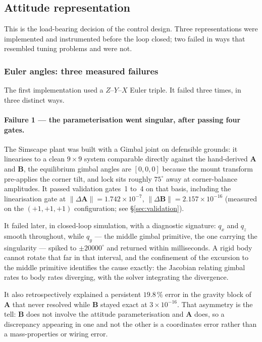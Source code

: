 \subsection{Attitude representation}
\label{sec:attitude-representation}

This is the load-bearing decision of the control design. Three
representations were implemented and instrumented before the loop closed; two
failed in ways that resembled tuning problems and were not.

\subsubsection{Euler angles: three measured failures}
\label{sec:euler-failures}

The first implementation used a $Z$--$Y$--$X$ Euler triple. It failed three
times, in three distinct ways.

\paragraph{Failure 1 --- the parameterisation went singular, after passing
four gates.} The Simscape plant was built with a Gimbal joint on defensible
grounds: it linearises to a clean $9\times9$ system comparable directly
against the hand-derived $\bm{A}$ and $\bm{B}$, the equilibrium gimbal angles
are $[0,0,0]$ because the mount transform pre-applies the corner tilt, and
lock sits roughly $75^\circ$ away at corner-balance amplitudes. It passed
validation gates~1 to~4 on that basis, including the linearisation gate at
$\lVert\Delta\bm{A}\rVert = 1.742\times10^{-7}$,
$\lVert\Delta\bm{B}\rVert = 2.157\times10^{-16}$ (measured on the
$(+1,+1,+1)$ configuration; see \S\ref{sec:validation}).

It failed later, in closed-loop simulation, with a diagnostic signature:
$q_x$ and $q_z$ smooth throughout, while $q_y$ --- the middle gimbal
primitive, the one carrying the singularity --- spiked to $\pm20000^\circ$
and returned within milliseconds. A rigid body cannot rotate that far in that
interval, and the confinement of the excursion to the middle primitive
identifies the cause exactly: the Jacobian relating gimbal rates to body
rates diverging, with the solver integrating the divergence.

It also retrospectively explained a persistent $19.8\,\%$ error in the
gravity block of $\bm{A}$ that never resolved while $\bm{B}$ stayed exact at
$3\times10^{-16}$. That asymmetry is the tell: $\bm{B}$ does not involve the
attitude parameterisation and $\bm{A}$ does, so a discrepancy appearing in
one and not the other is a coordinates error rather than a mass-properties
or wiring error.


